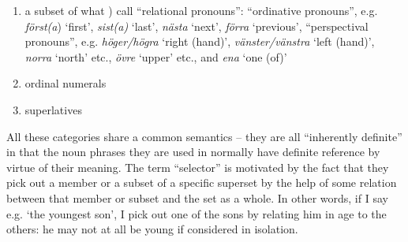 \begin{enumerate}
\item a subset of what \citet[435]{TelemanEtAl1999}) call “relational pronouns”: “ordinative pronouns”, e.g. \textit{först(a}) ‘first’, \textit{sist(a)} ‘last’, \textit{nästa} ‘next’, \textit{förra }‘previous’, “perspectival pronouns”, e.g. \textit{höger/högra }‘right (hand)’, \textit{vänster/vänstra} ‘left (hand)’, \textit{norra} ‘north’ etc., \textit{övre} ‘upper’ etc., and \textit{ena} ‘one (of)’ 


\item ordinal numerals


\item superlatives




\end{enumerate}

All these categories share a common semantics – they are all “inherently definite” in that the noun phrases they are used in normally have definite reference by virtue of their meaning. The term “selector” is motivated by the fact that they pick out a member or a subset of a specific superset by the help of some relation between that member or subset and the set as a whole. In other words, if I say e.g.  ‘the youngest son’, I pick out one of the sons by relating him in age to the others: he may not at all be young if considered in isolation. 

